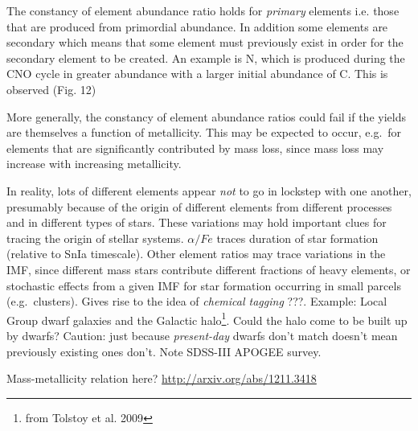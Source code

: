\documentclass{article}
\newcommand{\mynotes}[1]{\textcolor{cadmiumgreen}{#1}}
\begin{document}
The constancy of element abundance ratio holds for \emph{primary}
elements i.e. those that are produced from primordial abundance.
In addition some elements are secondary which means that some element must
previously exist in order for the secondary element to be created.
An example is N, which is produced during the CNO cycle
in greater abundance with a larger initial abundance of C.
This is observed (Fig. 12)

More generally, the constancy of element abundance ratios could fail if
the yields are themselves a function of metallicity. This may be
expected to occur, e.g.\ for elements that are significantly contributed by mass
loss, since mass loss may increase with increasing metallicity.

In reality, lots of different elements appear \emph{not} to go
in lockstep with one another, presumably because of the origin of different
elements from different processes and in different types of stars.
These variations may hold important clues for tracing the origin of stellar
systems. $\alpha/Fe$ traces duration of star formation (relative to
SnIa timescale). Other element ratios may trace variations in the IMF,
since different mass stars contribute different fractions of heavy
elements, or stochastic effects from a given IMF for star formation occurring
in small parcels (e.g.\ clusters). Gives rise to the idea of
\textit{chemical tagging} \mynotes{???}. Example: Local Group
dwarf galaxies and the Galactic halo\footnote{from Tolstoy et al. 2009}.
Could the halo come to be built up by dwarfs? Caution: just because
\emph{present-day} dwarfs don't match doesn't mean previously existing
ones don't. Note SDSS-III APOGEE survey.

Mass-metallicity relation here? \url{http://arxiv.org/abs/1211.3418}
\end{document}
